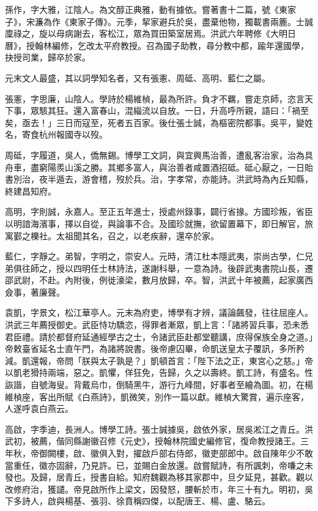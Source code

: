 \begin{pinyinscope}
孫作，字大雅，江陰人。為文醇正典雅，動有據依。嘗著書十二篇，號《東家子》，宋濂為作《東家子傳》。元季，挈家避兵於吳，盡棄他物，獨載書兩簏。士誠廩祿之，旋以母病謝去，客松江，眾為買田築室居焉。洪武六年聘修《大明日曆》，授翰林編修，乞改太平府教授。召為國子助教，尋分教中都，踰年還國學，抉授司業，歸卒於家。

元末文人最盛，其以詞學知名者，又有張憲、周砥、高明、藍仁之屬。

張憲，字思廉，山陰人。學詩於楊維楨，最為所許。負才不羈，嘗走京師，恣言天下事，眾駭其狂。還入富春山，混緇流以自放。一日，升高呼所親，語曰：「禍至矣，亟去！」三日而寇至，死者五百家。後仕張士誠，為樞密院都事。吳平，變姓名，寄食杭州報國寺以歿。

周砥，字履道，吳人，僑無錫。博學工文詞，與宜興馬治善，遭亂客治家，治為具舟車，盡窮陽羨山溪之勝。其鄉多富人，與治善者咸置酒招砥。砥心厭之，一日貽書別治，夜半遁去，游會稽，歿於兵。治，字孝常，亦能詩。洪武時為內丘知縣，終建昌知府。

高明，字則誠，永嘉人。至正五年進士，授處州錄事，闢行省掾。方國珍叛，省臣以明諳海濱事，擇以自從，與論事不合。及國珍就撫，欲留置幕下，即日解官，旅寓鄞之櫟社。太祖聞其名，召之，以老疾辭，還卒於家。

藍仁，字靜之。弟智，字明之，崇安人。元時，清江杜本隱武夷，崇尚古學，仁兄弟俱往師之，授以四明任士林詩法，遂謝科舉，一意為詩。後辟武夷書院山長，遷邵武尉，不赴。內附後，例徙濠梁，數月放歸，卒。智，洪武十年被薦，起家廣西僉事，著廉聲。

袁凱，字景文，松江華亭人。元末為府吏，博學有才辨，議論飆發，往往屈座人。洪武三年薦授御史。武臣恃功驕恣，得罪者漸眾，凱上言：「諸將習兵事，恐未悉君臣禮。請於都督府延通經學古之士，令諸武臣赴都堂聽講，庶得保族全身之道。」帝敕臺省延名士直午門，為諸將說書。後帝慮囚畢，命凱送皇太子覆訊，多所矜減。凱還報，帝問「朕與太子孰是？」凱頓首言：「陛下法之正，東宮心之慈。」帝以凱老猾持兩端，惡之。凱懼，佯狂免，告歸，久之以壽終。凱工詩，有盛名。性詼諧，自號海叟。背戴烏巾，倒騎黑牛，游行九峰間，好事者至繪為圖。初，在楊維楨座，客出所賦《白燕詩》，凱微笑，別作一篇以獻。維楨大驚賞，遍示座客，人遂呼袁白燕云。

高啟，字季迪，長洲人。博學工詩。張士誠據吳，啟依外家，居吳淞江之青丘。洪武初，被薦，偕同縣謝徽召修《元史》，授翰林院國史編修官，復命教授諸王。三年秋，帝御闕樓，啟、徽俱入對，擢啟戶部右侍郎，徽吏部郎中。啟自陳年少不敢當重任，徽亦固辭，乃見許。已，並賜白金放還。啟嘗賦詩，有所諷刺，帝嗛之未發也。及歸，居青丘，授書自給。知府魏觀為移其家郡中，旦夕延見，甚歡。觀以改修府治，獲譴。帝見啟所作上梁文，因發怒，腰斬於市，年三十有九。明初，吳下多詩人，啟與楊基、張羽、徐賁稱四傑，以配唐王、楊、盧、駱云。


\end{pinyinscope}

